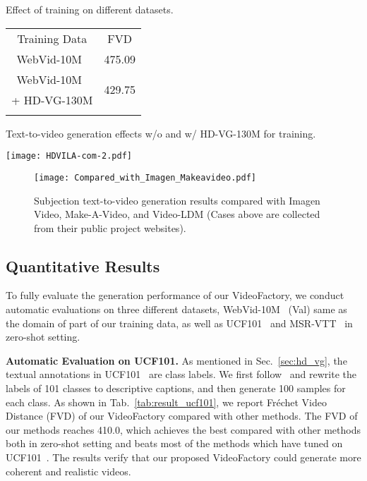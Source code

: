 \documentclass{article}
\begin{document}
\begin{minipage}[t]{\textwidth}
\centering
\footnotesize
\begin{minipage}[t]{0.29\textwidth}
\makeatletter{}
\centering
    \caption{Effect of training on different datasets.}
    \renewcommand{\arraystretch}{1.2}
        \begin{tabular}{c c}
        \Xhline{1.2pt}
         Training Data        & FVD  \\
        \Xhline{0.4pt}
         WebVid-10M~\cite{bain2021frozen}  & 475.09 \\
         \Xhline{0.4pt}
         WebVid-10M~\cite{bain2021frozen} & \multirow{2}{*}{429.75} \\
         + HD-VG-130M    &  \\
        \Xhline{1.2pt}
        \end{tabular}\label{tab:aba_dataset}
    \end{minipage}
\hspace{0.01\textwidth}
\begin{minipage}[t]{0.67\textwidth}
\makeatletter{}
\centering
    \caption{Text-to-video generation effects w/o and w/ HD-VG-130M for training.}
    \centering
    \texttt{[image: HDVILA-com-2.pdf]}
    \label{fig:com_w_wo_HD}
\end{minipage}
\end{minipage}


\begin{figure}[t]
    \centering
    \texttt{[image: Compared\_with\_Imagen\_Makeavideo.pdf]}
    \caption{Subjection text-to-video generation results compared with Imagen Video, Make-A-Video, and Video-LDM (Cases above are collected from their public project websites).}
    \label{fig:com_imagen_makeavideo}
    \vspace{-7mm}
\end{figure}


\subsection{Quantitative Results}
To fully evaluate the generation performance of our VideoFactory, we conduct automatic evaluations on three different datasets, 
WebVid-10M~\cite{bain2021frozen} (Val) same as the domain of part of our training data, as well as UCF101~\cite{soomro2012ucf101} and MSR-VTT~\cite{xu2016msr} in zero-shot setting. 


\noindent \textbf{Automatic Evaluation on UCF101.} 
As mentioned in Sec.~\ref{sec:hd_vg}, the textual annotations in UCF101~\cite{soomro2012ucf101} are class labels. We first follow~\cite{2022_VDM, MakeAVideo} and rewrite the labels of 101 classes to descriptive captions, and then generate 100 samples for each class. As shown in Tab.~\ref{tab:result_ucf101}, we report Fréchet Video Distance (FVD) of our VideoFactory compared with other methods. The FVD of our methods reaches 410.0, which achieves the best compared with other methods both in zero-shot setting and beats most of the methods which have tuned on UCF101~\cite{soomro2012ucf101}. The results verify that our proposed VideoFactory could generate more coherent and realistic videos.
\end{document}
